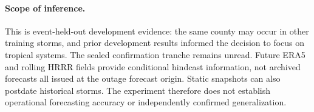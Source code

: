 \paragraph{Scope of inference.}
This is event-held-out development evidence: the same county may occur in
other training storms, and prior development results informed the decision
to focus on tropical systems. The sealed confirmation tranche remains unread.
Future ERA5 and rolling HRRR fields provide conditional hindcast information,
not archived forecasts all issued at the outage forecast origin. Static
snapshots can also postdate historical storms. The experiment therefore does
not establish operational forecasting accuracy or independently confirmed
generalization.
